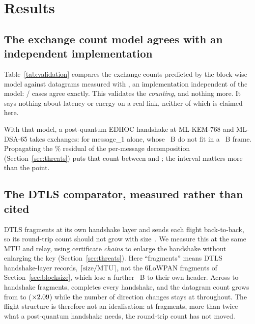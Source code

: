 \section{Results}
\label{sec:results}

\subsection{The exchange count model agrees with an independent implementation}

Table~\ref{tab:validation} compares the exchange counts predicted by the block-wise model
against datagrams measured with \numMOneImpl, an implementation independent of the model:
\numMOneMatch/\numMOneTotal{} cases agree exactly. This validates the \emph{counting}, and
nothing more. It says nothing about latency or energy on a real link, neither of which is
claimed here.

With that model, a post-quantum EDHOC handshake at ML-KEM-768 and ML-DSA-65 takes
\numExchTotalPQ{} exchanges: \numExchOnePQ{} for message\_1 alone, whose \numMsgOnePQ~B do not
fit in a \numFramePayload~B frame. Propagating the \numDecompError\% residual of the
per-message decomposition (Section~\ref{sec:threats}) puts that count between \numExchLo{}
and \numExchHi{}; the interval matters more than the point.


\subsection{The DTLS comparator, measured rather than cited}

DTLS fragments at its own handshake layer and sends each flight back-to-back, so its
round-trip count should not grow with size~\cite{rfc9147}. We measure this at the same MTU and relay,
using certificate \emph{chains} to enlarge the handshake without enlarging the key
(Section~\ref{sec:threats}). Here ``fragments'' means DTLS handshake-layer records, $\lceil\text{size}/\text{MTU}\rceil$,
not the 6LoWPAN fragments of Section~\ref{sec:blocksize}, which lose a further \numFragHdr~B
to their own header. Across \numDtlsMinFrag{} to \numDtlsMaxFrag{} handshake fragments, \numDtlsImpl{} completes every
handshake, and the datagram count grows from \numDtlsDatagramLo{} to \numDtlsDatagramHi{}
($\times2.09$) while the number of direction changes stays at
\numDtlsMeasTurns{} throughout. The flight structure is therefore not an idealisation: at
\numDtlsMaxFrag{} fragments, more than twice what a post-quantum handshake needs, the
round-trip count has not moved.

